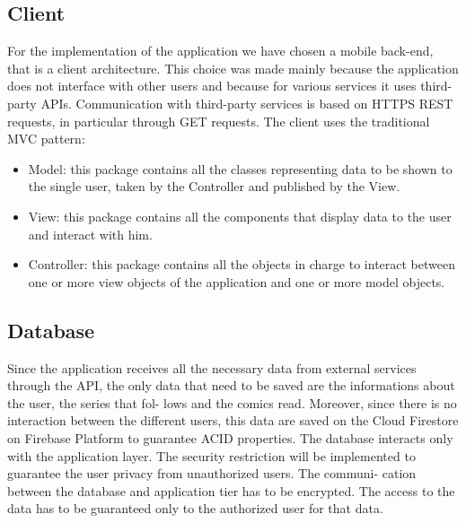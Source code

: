 \clearpage

\subsection{Client}
For the implementation of the application we have chosen a mobile back-end, that is a client architecture. This choice was made mainly because the application does not interface with other users and because for various services it uses third-party APIs. Communication with third-party services is based on HTTPS REST requests, in particular through GET requests.
The client uses the traditional MVC pattern:
\begin{itemize}
\item Model: this package contains all the classes representing data to be shown to the single user, taken by the Controller and published by the View.
\item View: this package contains all the components that display data to the user and interact with him.
\item Controller: this package contains all the objects in charge to interact between one or more view objects of the application and one or more model objects.
\end{itemize}

\subsection{Database}
Since the application receives all the necessary data from external services through the API, the only data that need to be saved are the informations about the user, the series that fol- lows and the comics read. Moreover, since there is no interaction between the different users, this data are saved on the Cloud Firestore on Firebase Platform to guarantee ACID properties. The database interacts only with the application layer. The security restriction will be implemented to guarantee the user privacy from unauthorized users. The communi- cation between the database and application tier has to be encrypted. The access to the data has to be guaranteed only to the authorized user for that data.

